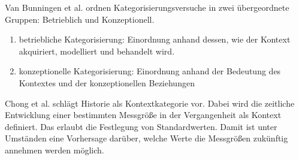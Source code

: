 Van Bunningen et al. \cite{van2005context} ordnen Kategorisierungsversuche in zwei übergeordnete Gruppen: Betrieblich und Konzeptionell. 
\begin{enumerate}
\item{betriebliche Kategorisierung: Einordnung anhand dessen, wie der Kontext akquiriert, modelliert und behandelt wird.}
\item{konzeptionelle Kategorisierung: Einordnung anhand der Bedeutung des Kontextes und der konzeptionellen Beziehungen}
\end{enumerate}
Chong et al.\cite{chong_context-aware_nodate} schlägt Historie als Kontextkategorie vor. Dabei wird die zeitliche Entwicklung einer bestimmten Messgröße in der Vergangenheit als Kontext definiert. Das erlaubt die Festlegung von Standardwerten. Damit ist unter Umständen eine Vorhersage darüber, welche Werte die Messgrößen zukünftig annehmen werden möglich.


